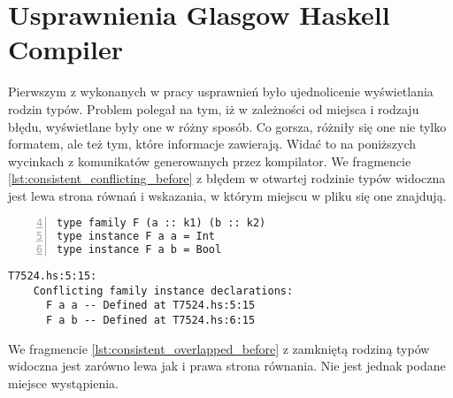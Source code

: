 \chapter{Usprawnienia Glasgow Haskell Compiler}\label{chap:badania}

\label{sec:zgloszenie_10839}

Pierwszym z wykonanych w pracy usprawnień było ujednolicenie wyświetlania rodzin typów. Problem polegał na tym, iż w zależności od miejsca i rodzaju błędu, wyświetlane były one w różny sposób. Co gorsza, różniły się one nie tylko formatem, ale też tym, które informacje zawierają. Widać to na poniższych wycinkach z komunikatów generowanych przez kompilator. We fragmencie \ref{lst:consistent_conflicting_before} z błędem w otwartej rodzinie typów widoczna jest lewa strona równań i wskazania, w którym miejscu w pliku się one znajdują.

\begin{lstlisting}[float,numbers=left,firstnumber=4,label={lst:consistent_conflicting_code},
                   caption={Fragment testu T7524 z dwoma równaniami otwartej rodziny typów będącymi w konflikcie.}]
type family F (a :: k1) (b :: k2)
type instance F a a = Int
type instance F a b = Bool
\end{lstlisting}

\begin{lstlisting}[float,language={},label={lst:consistent_conflicting_before},
                   caption={Błąd generowany przez kompilator w przypadku \ref{lst:consistent_conflicting_code} przed wprowadzeniem zmian.}]
T7524.hs:5:15:
    Conflicting family instance declarations:
      F a a -- Defined at T7524.hs:5:15
      F a b -- Defined at T7524.hs:6:15
\end{lstlisting}

We fragmencie \ref{lst:consistent_overlapped_before} z zamkniętą rodziną typów widoczna jest zarówno lewa jak i prawa strona równania. Nie jest jednak podane miejsce wystąpienia.

